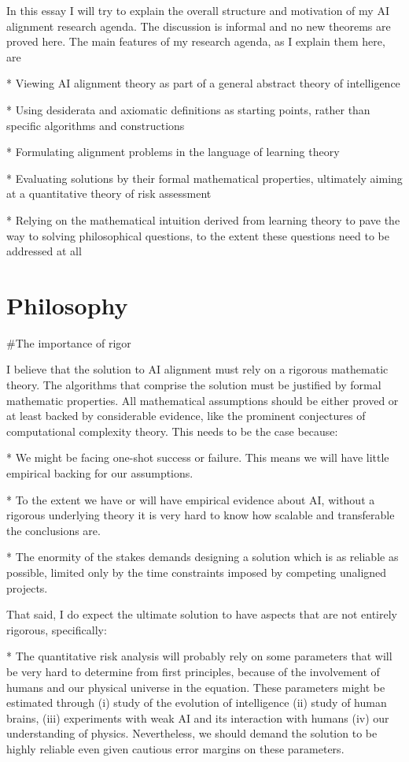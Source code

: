 \documentclass[a4paper]{article}
\begin{document}
In this essay I will try to explain the overall structure and motivation of my AI alignment research agenda. The discussion is informal and no new theorems are proved here. The main features of my research agenda, as I explain them here, are 

* Viewing AI alignment theory as part of a general abstract theory of intelligence

* Using desiderata and axiomatic definitions as starting points, rather than specific algorithms and constructions

* Formulating alignment problems in the language of learning theory

* Evaluating solutions by their formal mathematical properties, ultimately aiming at a quantitative theory of risk assessment

* Relying on the mathematical intuition derived from learning theory to pave the way to solving philosophical questions, to the extent these questions need to be addressed at all

\section{Philosophy}

\#The importance of rigor

I believe that the solution to AI alignment must rely on a rigorous mathematic theory. The algorithms that comprise the solution must be justified by formal mathematic properties. All mathematical assumptions should be either proved or at least backed by considerable evidence, like the prominent conjectures of computational complexity theory. This needs to be the case because:

* We might be facing one-shot success or failure. This means we will have little empirical backing for our assumptions.

* To the extent we have or will have empirical evidence about AI, without a rigorous underlying theory it is very hard to know how scalable and transferable the conclusions are.

* The enormity of the stakes demands designing a solution which is as reliable as possible, limited only by the time constraints imposed by competing unaligned projects.

That said, I do expect the ultimate solution to have aspects that are not entirely rigorous, specifically:

* The quantitative risk analysis will probably rely on some parameters that will be very hard to determine from first principles, because of the involvement of humans and our physical universe in the equation. These parameters might be estimated through (i) study of the evolution of intelligence (ii) study of human brains, (iii) experiments with weak AI and its interaction with humans (iv) our understanding of physics. Nevertheless, we should demand the solution to be highly reliable even given cautious error margins on these parameters.
\end{document}
